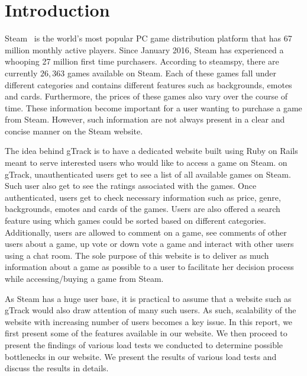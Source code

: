 \chapter{Introduction}

Steam~\cite{steam} is the world's most popular PC game distribution platform that has 67 million monthly active players. Since January 2016, Steam has experienced a whooping 27 million first time purchasers. According to steamspy, there are currently $26,363$ games available on Steam. Each of these games fall under different categories and contains different features such as backgrounds, emotes and cards. Furthermore, the prices of these games also vary over the course of time. These information become important for a user wanting to purchase a game from Steam. However, such information are not always present in a clear and concise manner on the Steam website. 

The idea behind gTrack is to have a dedicated website built using Ruby on Rails~\cite{ror} meant to serve interested users who would like to access a game on Steam. on gTrack, unauthenticated users get to see a list of all available games on Steam. Such user also get to see the ratings associated with the games. Once authenticated, users get to check necessary information such as price, genre, backgrounds, emotes and cards of the games. Users are also offered a search feature using which games could be sorted based on different categories. Additionally, users are allowed to comment on a game, see comments of other users about a game, up vote or down vote a game and interact with other users using a chat room. The sole purpose of this website is to deliver as much information about a game as possible to a user to facilitate her decision process while accessing/buying a game from Steam.

As Steam has a huge user base, it is practical to assume that a website such as gTrack would also draw attention of many such users. As such, scalability of the website with increasing number of users becomes a key issue. In this report, we first present some of the features available in our website. We then proceed to present the findings of various load tests we conducted to determine possible bottlenecks in our website. We present the results of various load tests and discuss the results in details.  

